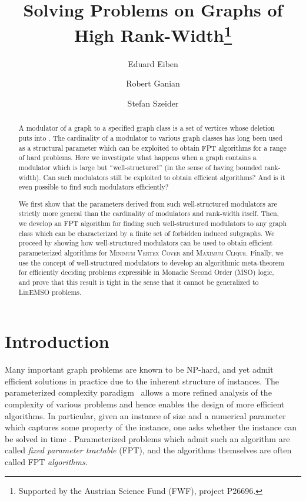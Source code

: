 \documentclass{llncs}
\begin{document}
\title{Solving Problems on Graphs of High Rank-Width\thanks{Supported by the Austrian Science Fund (FWF), project P26696.}}

\author{Eduard Eiben \and Robert Ganian \and Stefan Szeider}




\maketitle


\begin{abstract}
\noindent A modulator of a graph  to a specified graph class  is a set of vertices whose deletion puts  into . The cardinality of a modulator to various graph classes has long been used as a structural parameter which can be exploited to obtain FPT algorithms for a range of hard problems.
  Here we investigate what happens when a graph contains a modulator which is large but ``well-structured'' (in the sense of having bounded rank-width). Can such modulators still be exploited to obtain efficient algorithms? And is it even possible to find such modulators efficiently?
  
  We first show that the parameters derived from such well-structured modulators are strictly more general than the cardinality of modulators and rank-width itself. Then, we develop an FPT algorithm for finding such well-structured modulators to any graph class which can be characterized by a finite set of forbidden induced subgraphs. We proceed by showing how well-structured modulators can be used to obtain efficient parameterized algorithms for \textsc{Minimum Vertex Cover} and \textsc{Maximum Clique}. Finally, we use the concept of well-structured modulators to develop an algorithmic meta-theorem for efficiently deciding problems expressible in Monadic Second Order (MSO) logic, and prove that this result is tight in the sense that it cannot be generalized to LinEMSO problems.
\end{abstract}



\section{Introduction}

Many important graph problems are known to be NP-hard, and yet admit efficient solutions in practice due to the inherent structure of instances. The parameterized complexity paradigm~\cite{DowneyFellows13,Niedermeier06} allows a more refined analysis of the complexity of various problems and hence enables the design of more efficient algorithms. In particular, given an instance of size  and a numerical parameter  which captures some property of the instance, one asks whether the instance can be solved in time . Parameterized problems which admit such an algorithm are called \emph{fixed parameter tractable} (FPT), and the algorithms themselves are often called FPT \emph{algorithms}.
\end{document}
